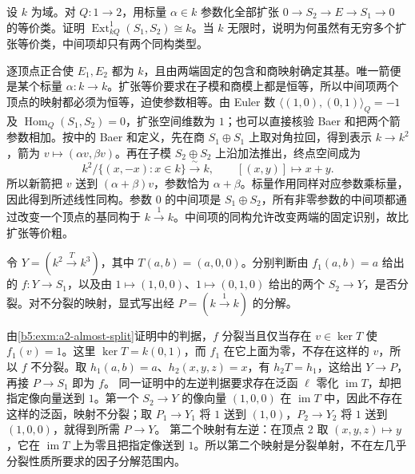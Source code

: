 \begin{optionalexercise}\label{b5:ex:10-almost-split-ext}
	设 \(k\) 为域。对 \(Q:1\to2\)，用标量 \(\alpha\in k\) 参数化全部扩张 \(0\to S_2\to E\to S_1\to0\) 的等价类。证明 \(\operatorname{Ext}^1_{kQ}(S_1,S_2)\cong k\)。当 \(k\) 无限时，说明为何虽然有无穷多个扩张等价类，中间项却只有两个同构类型。
\end{optionalexercise}
\begin{solution}
	逐顶点正合使 \(E_1,E_2\) 都为 \(k\)，且由两端固定的包含和商映射确定其基。唯一箭便是某个标量 \(\alpha:k\to k\)。扩张等价要求在子模和商模上都是恒等，所以中间项两个顶点的映射都必须为恒等，迫使参数相等。由 Euler 数 \(\bigl\langle(1,0),(0,1)\bigr\rangle_Q=-1\) 及 \(\operatorname{Hom}_Q(S_1,S_2)=0\)，扩张空间维数为 \(1\)；也可以直接核验 Baer 和把两个箭参数相加。按中的 Baer 和定义，先在商 \(S_1\oplus S_1\) 上取对角拉回，得到表示 \(k\to k^2\)，箭为 \(v\mapsto(\alpha v,\beta v)\)。再在子模 \(S_2\oplus S_2\) 上沿加法推出，终点空间成为
	\[
		k^2/\{(x,-x):x\in k\}\xrightarrow{\ \sim\ }k, \qquad [(x,y)]\longmapsto x+y.
	\]
	所以新箭把 \(v\) 送到 \((\alpha+\beta)v\)，参数恰为 \(\alpha+\beta\)。标量作用同样对应参数乘标量，因此得到所述线性同构。参数 \(0\) 的中间项是 \(S_1\oplus S_2\)，所有非零参数的中间项都通过改变一个顶点的基同构于 \(k\xrightarrow{1}k\)。中间项的同构允许改变两端的固定识别，故比扩张等价粗。
\end{solution}

\begin{optionalexercise}\label{b5:ex:10-almost-split-factors}
	令 \(Y=(k^2\xrightarrow{T}k^3)\)，其中 \(T(a,b)=(a,0,0)\)。分别判断由 \(f_1(a,b)=a\) 给出的 \(f:Y\to S_1\)，以及由 \(1\mapsto(1,0,0)\)、\(1\mapsto(0,1,0)\) 给出的两个 \(S_2\to Y\)，是否分裂。对不分裂的映射，显式写出经 \(P=(k\xrightarrow{1}k)\) 的分解。
\end{optionalexercise}
\begin{solution}
	由\cref{b5:exm:a2-almost-split}证明中的判据，\(f\) 分裂当且仅当存在 \(v\in\ker T\) 使 \(f_1(v)=1\)。这里 \(\ker T=k(0,1)\)，而 \(f_1\) 在它上面为零，不存在这样的 \(v\)，所以 \(f\) 不分裂。取 \(h_1(a,b)=a\)、\(h_2(x,y,z)=x\)，有 \(h_2T=h_1\)，这给出 \(Y\to P\)，再接 \(P\to S_1\) 即为 \(f\)。 同一证明中的左逆判据要求存在泛函 \(\ell\) 零化 \(\operatorname{im}T\)，却把指定像向量送到 \(1\)。第一个 \(S_2\to Y\) 的像向量 \((1,0,0)\) 在 \(\operatorname{im}T\) 中，因此不存在这样的泛函，映射不分裂；取 \(P_1\to Y_1\) 将 \(1\) 送到 \((1,0)\)，\(P_2\to Y_2\) 将 \(1\) 送到 \((1,0,0)\)，就得到所需 \(P\to Y\)。 第二个映射有左逆：在顶点 \(2\) 取 \((x,y,z)\mapsto y\)，它在 \(\operatorname{im}T\) 上为零且把指定像送到 \(1\)。所以第二个映射是分裂单射，不在左几乎分裂性质所要求的因子分解范围内。
\end{solution}

